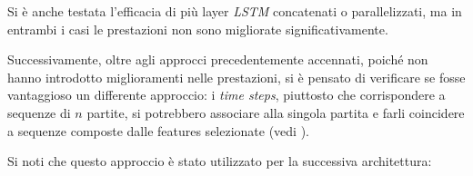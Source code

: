 Si è anche testata l'efficacia di più layer \textit{LSTM} concatenati o parallelizzati, ma in entrambi i casi le prestazioni non sono migliorate significativamente. 

Successivamente, oltre agli approcci precedentemente accennati, poiché non hanno introdotto miglioramenti nelle prestazioni, si è pensato di verificare se fosse vantaggioso un differente approccio: i \textit{time steps}, piuttosto che corrispondere a sequenze di $n$ partite, si potrebbero associare alla singola partita e farli coincidere a sequenze composte dalle features selezionate (vedi \cite{web:football_lstm}).

Si noti che questo approccio è stato utilizzato per la successiva architettura:



